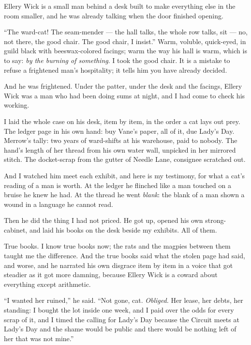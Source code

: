 \scenebreak

Ellery Wick is a small man behind a desk built to make everything else in the room smaller, and he was already talking when the door finished opening.

``The ward-cat! The seam-mender --- the hall talks, the whole row talks, sit --- no, not there, the good chair. The good chair, I insist.'' Warm, voluble, quick-eyed, in guild black with beeswax-colored facings; warm the way his hall is warm, which is to say: \emph{by the burning of something}. I took the good chair. It is a mistake to refuse a frightened man's hospitality; it tells him you have already decided.

And he was frightened. Under the patter, under the desk and the facings, Ellery Wick was a man who had been doing sums at night, and I had come to check his working.

I laid the whole case on his desk, item by item, in the order a cat lays out prey. The ledger page in his own hand: buy Vane's paper, all of it, due Lady's Day. Merrow's tally: two years of ward-shifts at his warehouse, paid to nobody. The hand's length of her thread from his own water wall, unpicked in her mirrored stitch. The docket-scrap from the gutter of Needle Lane, consignee scratched out.

And I watched him meet each exhibit, and here is my testimony, for what a cat's reading of a man is worth. At the ledger he flinched like a man touched on a bruise he knew he had. At the thread he went \emph{blank}: the blank of a man shown a wound in a language he cannot read.

Then he did the thing I had not priced. He got up, opened his own strong-cabinet, and laid his books on the desk beside my exhibits. All of them.

True books. I know true books now; the rats and the magpies between them taught me the difference. And the true books said what the stolen page had said, and worse, and he narrated his own disgrace item by item in a voice that got steadier as it got more damning, because Ellery Wick is a coward about everything except arithmetic.

``I wanted her ruined,'' he said. ``Not gone, cat. \emph{Obliged.} Her lease, her debts, her standing: I bought the lot inside one week, and I paid over the odds for every scrap of it, and I timed the calling for Lady's Day because the Circuit meets at Lady's Day and the shame would be public and there would be nothing left of her that was not mine.''

